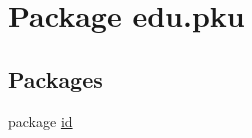 \hypertarget{namespaceedu_1_1pku}{
\section{Package edu.pku}
\label{namespaceedu_1_1pku}
}
\subsection*{Packages}
\begin{DoxyCompactItemize}
\item 
package \hyperlink{namespaceedu_1_1pku_1_1id}{id}
\end{DoxyCompactItemize}
